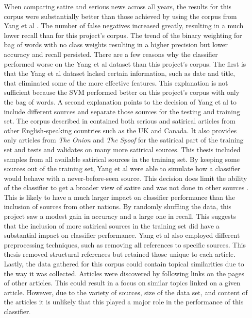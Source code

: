 \documentclass [12 pt] {report}
\begin{document}
When comparing satire and serious news across all years, the results for this corpus were substantially better than those achieved by using the corpus from Yang et al \cite{Yang}. The number of false negatives increased greatly, resulting in a much lower recall than for this project's corpus. The trend of the binary weighting for bag of words with no class weights resulting in a higher precision but lower accuracy and recall persisted. There are a few reasons why the classifier performed worse on the Yang et al dataset than this project's corpus. The first is that the Yang et al dataset lacked certain information, such as date and title, that eliminated some of the more effective features. This explanation is not sufficient because the SVM performed better on this project's corpus with only the bag of words. A second explanation points to the decision of Yang et al to include different sources and separate those sources for the testing and training set. The corpus described in \cite{Yang} contained both serious and satirical articles from other English-speaking countries such as the UK and Canada. It also provides only articles from \textit{The Onion} and \textit{The Spoof} for the satirical part of the training set and tests and validates on many more satirical sources. This thesis included samples from all available satirical sources in the training set. By keeping some sources out of the training set, Yang et al were able to simulate how a classifier would behave with a never-before-seen source. This decision does limit the ability of the classifier to get a broader view of satire and was not done in other sources \cite{Ahmad} \cite{Burfoot}. This is likely to have a much larger impact on classifier performance than the inclusion of sources from other nations. By randomly shuffling the data, this project saw a modest gain in accuracy and a large one in recall. This suggests that the inclusion of more satirical sources in the training set did have a substantial impact on  classifier performance. Yang et al also employed different preprocessing techniques, such as removing all references to specific sources. This thesis removed structural references but retained those unique to each article. Lastly, the data gathered for this corpus could contain topical similarities due to the way it was collected. Articles were discovered by following links on the pages of other articles. This could result in a focus on similar topics linked on a given article. However, due to the variety of sources, size of the data set, and content of the articles it is unlikely that this played a major role in the performance of this classifier.
\end{document}
